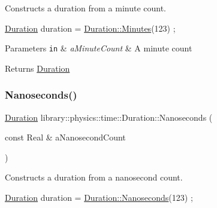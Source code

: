 Constructs a duration from a minute count. 


\begin{DoxyCode}
\hyperlink{classlibrary_1_1physics_1_1time_1_1_duration_a0a70efcf487a841da572afcf00001f64}{Duration} duration = \hyperlink{classlibrary_1_1physics_1_1time_1_1_duration_ad7171befa3075e796bfb02a7542dacdd}{Duration::Minutes}(123) ;
\end{DoxyCode}



\begin{DoxyParams}[1]{Parameters}
\mbox{\tt in}  & {\em a\+Minute\+Count} & A minute count \\
\hline
\end{DoxyParams}
\begin{DoxyReturn}{Returns}
\hyperlink{classlibrary_1_1physics_1_1time_1_1_duration}{Duration} 
\end{DoxyReturn}
\mbox{\label{classlibrary_1_1physics_1_1time_1_1_duration_a6a629b2275337fbadac912cc9364a9f1}} 
\subsubsection{\texorpdfstring{Nanoseconds()}{Nanoseconds()}}
{\footnotesize\ttfamily \hyperlink{classlibrary_1_1physics_1_1time_1_1_duration}{Duration} library\+::physics\+::time\+::\+Duration\+::\+Nanoseconds (\begin{DoxyParamCaption}\item[{const Real \&}]{a\+Nanosecond\+Count }\end{DoxyParamCaption})\hspace{0.3cm}{\ttfamily [static]}}



Constructs a duration from a nanosecond count. 


\begin{DoxyCode}
\hyperlink{classlibrary_1_1physics_1_1time_1_1_duration_a0a70efcf487a841da572afcf00001f64}{Duration} duration = \hyperlink{classlibrary_1_1physics_1_1time_1_1_duration_a6a629b2275337fbadac912cc9364a9f1}{Duration::Nanoseconds}(123) ;
\end{DoxyCode}



